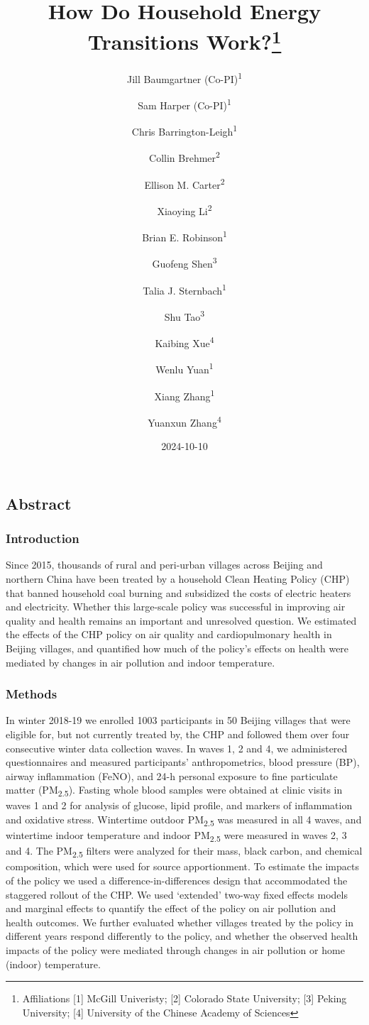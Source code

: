 \documentclass[
  letterpaper,
  DIV=11,
  numbers=noendperiod]{scrartcl}
\title{How Do Household Energy Transitions Work?\thanks{Affiliations
{[}1{]} McGill Univeristy; {[}2{]} Colorado State University; {[}3{]}
Peking University; {[}4{]} University of the Chinese Academy of
Sciences}}
\author{Jill Baumgartner (Co-PI)\textsuperscript{1} \and Sam Harper
(Co-PI)\textsuperscript{1} \and Chris
Barrington-Leigh\textsuperscript{1} \and Collin
Brehmer\textsuperscript{2} \and Ellison M.
Carter\textsuperscript{2} \and Xiaoying Li\textsuperscript{2} \and Brian
E. Robinson\textsuperscript{1} \and Guofeng
Shen\textsuperscript{3} \and Talia J.
Sternbach\textsuperscript{1} \and Shu
Tao\textsuperscript{3} \and Kaibing Xue\textsuperscript{4} \and Wenlu
Yuan\textsuperscript{1} \and Xiang Zhang\textsuperscript{1} \and Yuanxun
Zhang\textsuperscript{4}}
\date{2024-10-10}
\renewcommand*\contentsname{Table of contents}
\newcommand\contentsname{Table of contents}
\begin{document}
\maketitle

\renewcommand*\contentsname{Table of contents}
{
\hypersetup{linkcolor=}
\setcounter{tocdepth}{3}
\tableofcontents
}

\subsection*{Abstract}\label{abstract}

\subsubsection*{Introduction}\label{introduction}

Since 2015, thousands of rural and peri-urban villages across Beijing
and northern China have been treated by a household Clean Heating Policy
(CHP) that banned household coal burning and subsidized the costs of
electric heaters and electricity. Whether this large-scale policy was
successful in improving air quality and health remains an important and
unresolved question. We estimated the effects of the CHP policy on air
quality and cardiopulmonary health in Beijing villages, and quantified
how much of the policy's effects on health were mediated by changes in
air pollution and indoor temperature.

\subsubsection*{Methods}\label{methods}

In winter 2018-19 we enrolled 1003 participants in 50 Beijing villages
that were eligible for, but not currently treated by, the CHP and
followed them over four consecutive winter data collection waves. In
waves 1, 2 and 4, we administered questionnaires and measured
participants' anthropometrics, blood pressure (BP), airway inflammation
(FeNO), and 24-h personal exposure to fine particulate matter
(PM\textsubscript{2.5}). Fasting whole blood samples were obtained at
clinic visits in waves 1 and 2 for analysis of glucose, lipid profile,
and markers of inflammation and oxidative stress. Wintertime outdoor
PM\textsubscript{2.5} was measured in all 4 waves, and wintertime indoor
temperature and indoor PM\textsubscript{2.5} were measured in waves 2, 3
and 4. The PM\textsubscript{2.5} filters were analyzed for their mass,
black carbon, and chemical composition, which were used for source
apportionment. To estimate the impacts of the policy we used a
difference-in-differences design that accommodated the staggered rollout
of the CHP. We used `extended' two-way fixed effects models and marginal
effects to quantify the effect of the policy on air pollution and health
outcomes. We further evaluated whether villages treated by the policy in
different years respond differently to the policy, and whether the
observed health impacts of the policy were mediated through changes in
air pollution or home (indoor) temperature.
\end{document}
